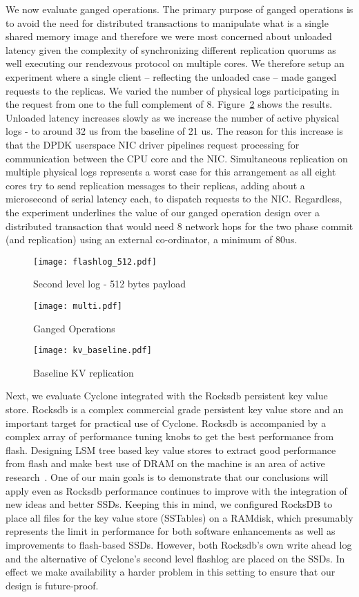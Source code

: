 \documentclass[twocolumn]{article}
\begin{document}
We now evaluate ganged operations. The primary purpose of
ganged operations is to avoid the need for distributed transactions to
manipulate what is a single shared memory image and therefore we were most
concerned about unloaded latency given the complexity of synchronizing different
replication quorums as well executing our rendezvous protocol on multiple
cores. We therefore setup an experiment where a single client -- reflecting the
unloaded case -- made ganged requests to the replicas. We varied the number of
physical logs participating in the request from one to the full complement of 8.
Figure~\ref{fig:ganged} shows the results. Unloaded
latency increases slowly as we increase the number of active physical logs - to
around 32 us from the baseline of 21 us. The reason for this increase is that
the DPDK userspace NIC driver pipelines request processing for communication
between the CPU core and the NIC. Simultaneous replication on multiple physical
logs represents a worst case for this arrangement as all eight cores try to
send replication messages to their replicas, adding about a microsecond of
serial latency each, to dispatch requests to the NIC. Regardless, the experiment
underlines the value of our ganged operation design over a distributed
transaction that would need 8 network hops for the two phase commit (and
replication) using an external co-ordinator, a minimum of 80us.

\begin{figure}
  \texttt{[image: flashlog\_512.pdf]}
  \caption{Second level log - 512 bytes payload}
  \label{fig:flashlog_512}
\end{figure}

\begin{figure}
  \texttt{[image: multi.pdf]}
  \caption{Ganged Operations}
  \label{fig:ganged}
\end{figure}

\begin{figure}
  \texttt{[image: kv\_baseline.pdf]}
  \caption{Baseline KV replication}
  \label{fig:kv_baseline}
\end{figure}

Next, we evaluate Cyclone integrated with the Rocksdb persistent key value
store. Rocksdb is a complex commercial grade persistent key value store and
an important target for practical use of Cyclone.  Rocksdb is accompanied by a
complex array of performance tuning knobs to get the best performance from
flash. Designing LSM tree based key value stores to extract good performance
from flash and make best use of DRAM on the machine is an area of active
research~\cite{flodb, triad}. One of our main goals is to demonstrate that
our conclusions will apply even as Rocksdb performance continues to improve
with the integration of new ideas and better SSDs. Keeping this in mind, we
configured RocksDB to place all files for the
key value store (SSTables) on a RAMdisk, which presumably represents the limit
in performance for both software enhancements as well as improvements to
flash-based SSDs. However, both Rocksdb's own write ahead log and the
alternative of Cyclone's second level flashlog are placed on the SSDs. In
effect we make availability a harder problem in this setting to ensure that our
design is future-proof.
\end{document}
